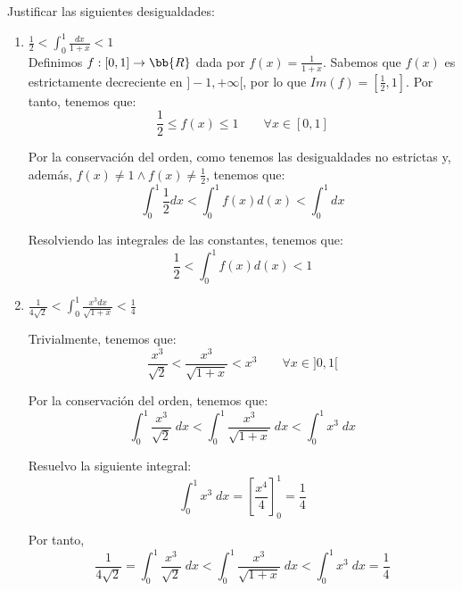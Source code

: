 \begin{ejercicio}
    Justificar las siguientes desigualdades:
    \begin{enumerate}
        \item $\displaystyle \frac{1}{2}< \int^1_0 \frac{dx}{1+x} < 1$\\

        Definimos $f:\left[0,1\right]\to \bb{R}$ dada por $f(x) = \frac{1}{1+x}$. Sabemos que $f(x)$ es estrictamente decreciente en $]-1, +\infty[$, por lo que $Im(f)=\left[\frac{1}{2},1\right]$. Por tanto, tenemos que:
        \begin{equation*}
            \frac{1}{2} \leq f(x) \leq 1 \qquad \forall x\in [0,1]
        \end{equation*}

        Por la conservación del orden, como tenemos las desigualdades no estrictas y, además, $f(x)\neq 1 \land f(x)\neq \frac{1}{2}$, tenemos que:
        \begin{equation*}
            \int_0^1\frac{1}{2}dx < \int_0^1f(x)d(x) < \int^1_0dx
        \end{equation*}

        Resolviendo las integrales de las constantes, tenemos que:
        \begin{equation*}
            \frac{1}{2} < \int_0^1f(x)d(x) < 1
        \end{equation*}

        \item $\displaystyle \frac{1}{4\sqrt{2}} < \int^1_0 \frac{x^3dx}{\sqrt{1+x}} < \frac{1}{4}$

        Trivialmente, tenemos que:
        \begin{equation*}
            \frac{x^3}{\sqrt{2}} < \frac{x^3}{\sqrt{1+x}} < x^3 \qquad \forall x\in ]0,1[
        \end{equation*}

        Por la conservación del orden, tenemos que:
        \begin{equation*}
            \int_0^1 \frac{x^3}{\sqrt{2}}\;dx < \int_0^1\frac{x^3}{\sqrt{1+x}}\;dx < \int_0^1 x^3\;dx
        \end{equation*}

        Resuelvo la siguiente integral:
        \begin{equation*}
            \int_0^1 x^3\;dx = \left[\frac{x^4}{4}\right]_0^1 = \frac{1}{4}
        \end{equation*}

        Por tanto,
        \begin{equation*}
            \frac{1}{4\sqrt{2}} = \int_0^1 \frac{x^3}{\sqrt{2}}\;dx < \int_0^1\frac{x^3}{\sqrt{1+x}}\;dx < \int_0^1 x^3\;dx = \frac{1}{4}
        \end{equation*}
    \end{enumerate}
\end{ejercicio}

